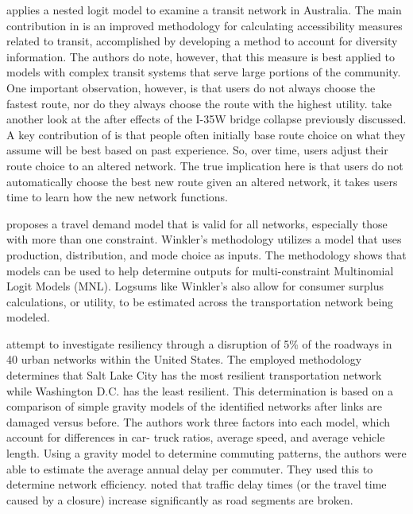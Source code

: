 \citet{Nassir2016} applies a nested logit model to examine a transit
network in Australia. The main contribution in \citet{Nassir2016} is an
improved methodology for calculating accessibility measures related to
transit, accomplished by developing a method to account for diversity
information. The authors do note, however, that this measure is best applied
to models with complex transit systems that serve large portions of the
community. One important observation, however, is that users do not always
choose the fastest route, nor do they always choose the route with the
highest utility. \citet{He2012} take another look at the after effects of
the I-35W bridge collapse previously discussed. A key contribution of
\citet{He2012} is that people often initially base route choice on what they
assume will be best based on past experience. So, over time, users
adjust their route choice to an altered network. The true implication here
is that users do not automatically choose the best new route given an
altered network, it takes users time to learn how the new network
functions.

\citet{winkler2016} proposes a travel demand model that is valid for all
networks,
especially those with more than one constraint.
Winkler’s methodology
utilizes a
model that uses production, distribution, and mode choice as inputs. The
methodology shows that models can be used to help determine outputs for
multi-constraint Multinomial Logit Models (MNL). Logsums like Winkler’s
also allow for consumer surplus calculations,
or utility, to be estimated across the transportation network
being modeled.

\citet{ganin2017} attempt to investigate resiliency through a disruption
of 5\% of the roadways
in 40 urban networks within the United States. The employed methodology
determines that Salt Lake
City has the most resilient transportation network while Washington D.C.
has the least resilient.
This determination is based on a comparison of simple gravity models of the identified networks after links are
damaged versus before.
The authors work three factors into each model, which account for
differences in car-
truck ratios, average speed, and average vehicle length. Using a gravity
model to determine commuting patterns, the authors were
able to estimate the average
annual delay per commuter. They used this to determine network efficiency.
\citet{ganin2017} noted that
traffic delay times (or the travel time caused by a closure) increase
significantly as road segments are broken.

